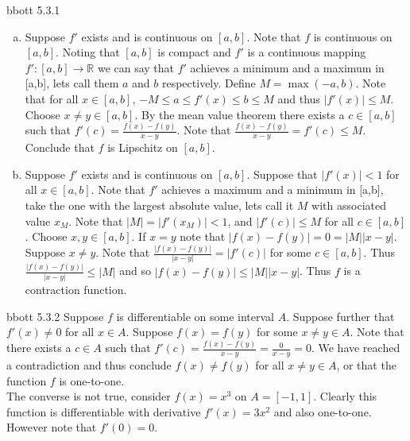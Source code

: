 \documentclass[12pt]{article}
\makeatletter
\theoremstyle{homework}
\newenvironment{exercise}[1]
{\def\@currentlabel{#1}\exercisecore}
{\endexercisecore}
\makeatother
\begin{document}
\begin{exercise}

Abbott 5.3.1
\end{exercise}
\begin{enumerate}[(a)]
\item
Suppose $f'$ exists and is continuous on $[a,b]$.  Note that $f$ is continuous on $[a,b]$.  Noting that $[a,b]$ is compact and $f'$ is a continuous mapping $f':[a,b]\rightarrow \mathbb{R}$ we can say that $f'$ achieves a minimum and a maximum in [a,b], lets call them $a$ and $b$ respectively.  Define $M=\max(-a,b)$.  Note that for all $x\in [a,b]$, $-M\leq a\leq f'(x)\leq b\leq M$ and thus $|f'(x)|\leq M$.  Choose $x\neq y\in [a,b]$.  By the mean value theorem there exists a $c\in[a,b]$ such that $f'(c)=\frac{f(x)-f(y)}{x-y}$.  Note that $\frac{f(x)-f(y)}{x-y}=f'(c)\leq M$.  Conclude that $f$ is Lipschitz on $[a,b]$.
\item
Suppose $f'$ exists and is continuous on $[a,b]$.  Suppose that $|f'(x)|<1$ for all $x\in[a,b]$.  Note that $f'$ achieves a maximum and a minimum in [a,b], take the one with the largest absolute value, lets call it $M$ with associated value $x_M$.  Note that $|M|=|f'(x_M)|<1$, and $|f'(c)|\leq M$ for all $c\in [a,b]$.  Choose $x,y\in[a,b]$.  If $x=y$ note that $|f(x)-f(y)|=0=|M||x-y|$.  Suppose $x\neq y$.  Note that $\frac{|f(x)-f(y)|}{|x-y|}=|f'(c)|$ for some $c\in [a,b]$.  Thus $\frac{|f(x)-f(y)|}{|x-y|}\leq |M|$ and so $|f(x)-f(y)|\leq |M||x-y|$.  Thus $f$ is a contraction function.

\end{enumerate}
\begin{exercise}

Abbott 5.3.2
\end{exercise}
Suppose $f$ is differentiable on some interval $A$.  Suppose further that $f'(x)\neq 0$ for all $x\in A$.  Suppose $f(x)=f(y)$ for some $x\neq y\in A$.  Note that there exists a $c\in A$ such that $f'(c)=\frac{f(x)-f(y)}{x-y}=\frac{0}{x-y}=0$.  We have reached a contradiction and thus conclude $f(x)\neq f(y)$ for all $x\neq y\in A$, or that the function $f$ is one-to-one.\\
The converse is not true, consider $f(x)=x^3$ on $A=[-1,1]$.  Clearly this function is differentiable with derivative $f'(x)=3x^2$ and also one-to-one.  However note that $f'(0)=0$.
\end{document}
